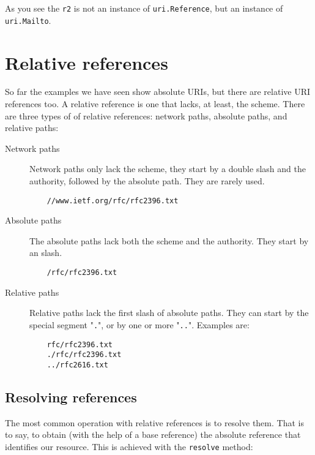 As you see the {\tt r2} is not an instance of {\tt uri.Reference}, but an
instance of {\tt uri.Mailto}.


\section{Relative references}

So far the examples we have seen show absolute URIs, but there are relative
URI references too. A relative reference is one that lacks, at least, the
scheme. There are three types of of relative references: network paths,
absolute paths, and relative paths:

\begin{description}
  \item [Network paths] Network paths only lack the scheme, they start by a
    double slash and the authority, followed by the absolute path. They are
    rarely used.

\begin{verbatim}
    //www.ietf.org/rfc/rfc2396.txt
\end{verbatim}

  \item [Absolute paths] The absolute paths lack both the scheme and the
     authority. They start by an slash.

\begin{verbatim}
    /rfc/rfc2396.txt
\end{verbatim}

  \item [Relative paths] Relative paths lack the first slash of absolute
    paths. They can start by the special segment "{\tt .}", or by one or
    more "{\tt ..}". Examples are:

\begin{verbatim}
    rfc/rfc2396.txt
    ./rfc/rfc2396.txt
    ../rfc2616.txt
\end{verbatim}

\end{description}


\subsection{Resolving references}

The most common operation with relative references is to resolve them. That
is to say, to obtain (with the help of a base reference) the absolute
reference that identifies our resource. This is achieved with the
{\tt resolve} method:

